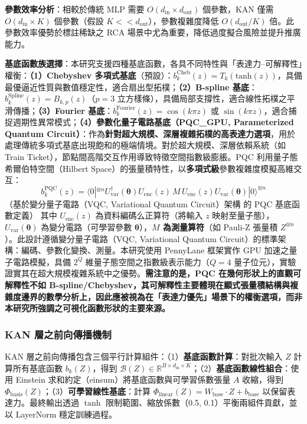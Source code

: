 \documentclass[10pt,a4paper,twocolumn]{article}
\begin{document}
\textbf{參數效率分析}：相較於傳統 MLP 需要 $O(d_{\text{in}} \times d_{\text{out}})$ 個參數，KAN 僅需 $O(d_{\text{in}} \times K)$ 個參數（假設 $K << d_{\text{out}}$），參數複雜度降低 $O(d_{\text{out}}/K)$ 倍。此參數效率優勢於標註稀缺之 RCA 場景中尤為重要，降低過度擬合風險並提升推廣能力。

\textbf{基底函數族選擇}：本研究支援四種基底函數，各具不同特性與「表達力–可解釋性」權衡：\textbf{（1）Chebyshev 多項式基底}（預設）：$b_k^{\text{Cheb}}(z) = T_k(\text{tanh}(z))$，具備最優逼近性質與數值穩定性，適合扇出型拓樸；\textbf{（2）B-spline 基底}：$b_k^{\text{Spline}}(z) = B_{k,p}(z)$（$p=3$ 立方樣條），具備局部支撐性，適合線性拓樸之平滑傳播；\textbf{（3）Fourier 基底}：$b_k^{\text{Fourier}}(z) = \cos(k \pi z)$ 或 $\sin(k \pi z)$，適合捕捉週期性異常模式；\textbf{（4）參數化量子電路基底（PQC\_GPU, Parameterized Quantum Circuit）}：作為\textbf{針對超大規模、深層複雜拓樸的高表達力選項}，用於處理傳統多項式基底出現飽和的極端情境。對於超大規模、深層依賴系統（如 Train Ticket），節點間高階交互作用導致特徵空間指數級膨脹。PQC 利用量子態希爾伯特空間（Hilbert Space）的張量積特性，以\textbf{多項式級}參數複雜度模擬高維交互：
\begin{equation}
b_k^{\text{PQC}}(z) = \langle 0|^{\otimes n} U^\dagger_{\text{var}}(\boldsymbol{\theta}) U_{\text{enc}}(z) \, M \, U_{\text{enc}}(z) U_{\text{var}}(\boldsymbol{\theta}) |0\rangle^{\otimes n}
\end{equation}
（基於變分量子電路（VQC, Variational Quantum Circuit）架構 \cite{pennylane} 的 PQC 基底函數定義）
其中 $U_{\text{enc}}(z)$ 為資料編碼么正算符（將輸入 $z$ 映射至量子態），$U_{\text{var}}(\boldsymbol{\theta})$ 為變分電路（可學習參數 $\boldsymbol{\theta}$），\textbf{$M$ 為測量算符}（如 Pauli-Z 張量積 $Z^{\otimes n}$）。此設計遵循變分量子電路（VQC, Variational Quantum Circuit）的標準架構：編碼、參數化變換、測量。本研究使用 PennyLane 框架實作 GPU 加速之量子電路模擬，具備 $2^Q$ 維量子態空間之指數級表示能力（$Q=4$ 量子位元），實驗證實其在超大規模複雜系統中之優勢。\textbf{需注意的是，PQC 在幾何形狀上的直觀可解釋性不如 B-spline/Chebyshev，其可解釋性主要體現在顯式張量積結構與複雜度邊界的數學分析上，因此應被視為在「表達力優先」場景下的權衡選項，而非本研究所強調之可視化函數形狀的主要來源。}

\subsubsection{KAN 層之前向傳播機制}

KAN 層之前向傳播包含三個平行計算組件：（1）\textbf{基底函數計算}：對批次輸入 $Z$ 計算所有基底函數 $b_k(Z)$，得到 $\mathcal{B}(Z) \in \mathbb{R}^{B \times d_{\text{in}} \times K}$；（2）\textbf{基底函數線性組合}：使用 Einstein 求和約定（einsum）將基底函數與可學習係數張量 $A$ 收縮，得到 $\Phi_{\text{basis}}(Z)$；（3）\textbf{可學習線性基底}：計算 $\Phi_{\text{linear}}(Z) = W_{\text{base}} \cdot Z + b_{\text{base}}$ 以保留表達力。最終輸出透過 $\tanh$ 限制範圍、縮放係數（0.5, 0.1）平衡兩組件貢獻，並以 LayerNorm 穩定訓練過程。
\end{document}
